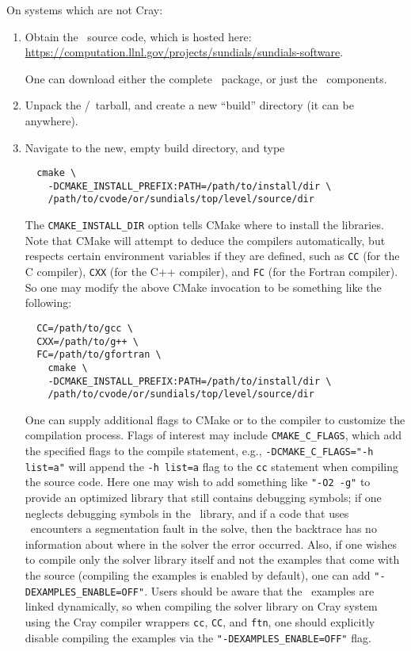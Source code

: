 On systems which are not Cray:
\begin{enumerate}

  \item Obtain the \cvode\ source code, which is hosted here: \url{https://computation.llnl.gov/projects/sundials/sundials-software}.

  One can download either the complete \sundials\ package, or just the \cvode\ components.

  \item Unpack the \cvode/\sundials\ tarball, and create a new ``build'' directory (it can be anywhere).

  \item Navigate to the new, empty build directory, and type

  \begin{verbatim}
  cmake \
    -DCMAKE_INSTALL_PREFIX:PATH=/path/to/install/dir \
    /path/to/cvode/or/sundials/top/level/source/dir
  \end{verbatim}

  The \texttt{CMAKE\_INSTALL\_DIR} option tells CMake where to install the libraries.
  Note that CMake will attempt to deduce the compilers automatically, but respects certain environment variables if they are defined, such as \texttt{CC} (for the C compiler), \texttt{CXX} (for the C++ compiler), and \texttt{FC} (for the Fortran compiler).
  So one may modify the above CMake invocation to be something like the following:

  \begin{verbatim}
  CC=/path/to/gcc \
  CXX=/path/to/g++ \
  FC=/path/to/gfortran \
    cmake \
    -DCMAKE_INSTALL_PREFIX:PATH=/path/to/install/dir \
    /path/to/cvode/or/sundials/top/level/source/dir
  \end{verbatim}

  One can supply additional flags to CMake or to the compiler to customize the compilation process. 
  Flags of interest may include \texttt{CMAKE\_C\_FLAGS}, which add the specified flags to the compile statement, e.g.,
  \texttt{-DCMAKE\_C\_FLAGS="-h list=a"} will append the \texttt{-h list=a} flag to the \texttt{cc} statement when compiling the source code.
  Here one may wish to add something like \texttt{"-O2 -g"} to provide an optimized library that still contains debugging symbols; 
  if one neglects debugging symbols in the \cvode\ library, and if a code that uses \cvode\ encounters a segmentation fault in the solve, 
  then the backtrace has no information about where in the solver the error occurred.
  Also, if one wishes to compile only the solver library itself and not the examples that come with the source 
  (compiling the examples is enabled by default), one can add \texttt{"-DEXAMPLES\_ENABLE=OFF"}.
  Users should be aware that the \cvode\ examples are linked dynamically, so when compiling the solver library on Cray system using the Cray compiler wrappers \texttt{cc}, \texttt{CC}, and \texttt{ftn}, one should explicitly disable compiling the examples via the \texttt{"-DEXAMPLES\_ENABLE=OFF"} flag.


\end{enumerate}
